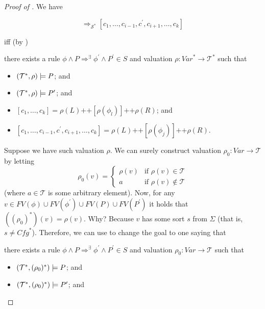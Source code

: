 \begin{proof}[Proof of ]
We have
\begin{proofenv}
\begin{equation*}
[c_1,\ldots,c_k] \Rightarrow_{\mathcal{S}^*} [c_1, \ldots, c_{i-1}, c^\prime, c_{i+1}, \ldots, c_k]    
\end{equation*}
\end{proofenv}
iff (by )
\begin{proofenv}
there exists a rule $\phi \land P \Rightarrow^\exists \phi^\prime \land P^\prime \in S$
and valuation $\rho : \mathit{Var}^* \to \mathcal{T}^*$ such that
\begin{itemize}
    \item $(\mathcal{T}^*, \rho) \models P$; and
    \item $(\mathcal{T}^*, \rho) \models P^\prime$; and
    \item $[c_1,\ldots,c_k] = \rho(L) \texttt{++} [\rho(\phi_l)] \texttt{++} \rho(R)$; and
    \item $[c_1, \ldots, c_{i-1}, c^\prime, c_{i+1}, \ldots, c_k] = \rho(L) \texttt{++} [\rho(\phi_j)] 
    \texttt{++} \rho(R)$.
\end{itemize}
\end{proofenv}
Suppose we have such valuation $\rho$.
We can surely construct valuation $\rho_0 : \mathit{Var} \to \mathcal{T}$ by letting
\begin{equation*}
\rho_0(v)=
    \begin{cases}
        \rho(v) & \text{if } \rho(v) \in \mathcal{T}\\
        a & \text{if } \rho(v) \not\in \mathcal{T}
    \end{cases}
\end{equation*}
(where $a \in \mathcal{T}$ is some arbitrary element).
Now, for any $v \in \mathit{FV}(\phi) \cup \mathit{FV}(\phi^\prime) \cup \mathit{FV}(P) \cup \mathit{FV}(P^\prime)$ it holds that
$((\rho_0)^*)(v) = \rho(v)$.
Why? Because $v$ has some sort $s$ from $\Sigma$
(that is, $s \not = \mathit{Cfg}^*$).
Therefore, we can use  to change the goal to one saying that
\begin{proofenv}
there exists a rule $\phi \land P \Rightarrow^\exists \phi^\prime \land P^\prime \in S$
and valuation $\rho_0 : \mathit{Var} \to \mathcal{T}$ such that
\begin{itemize}
    \item $(\mathcal{T}^*, (\rho_0)^*) \models P$; and
    \item $(\mathcal{T}^*, (\rho_0)^*) \models P^\prime$; and

\end{itemize}
\end{proofenv}
\end{proof}

